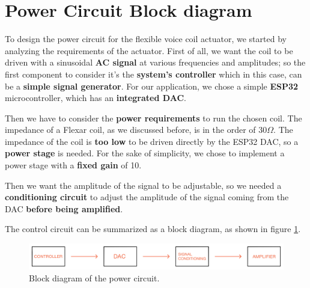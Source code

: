 \section{Power Circuit Block diagram}

To design the power circuit for the flexible voice coil actuator, we started by analyzing the requirements of the actuator.
First of all, we want the coil to be driven with a sinusoidal \textbf{AC signal} at various frequencies and amplitudes; so the first component to consider it's the \textbf{system's controller} which in this case, can be a \textbf{simple signal generator}.
For our application, we chose a simple \textbf{ESP32} microcontroller, which has an \textbf{integrated DAC}.
\bigskip

Then we have to consider the \textbf{power requirements} to run the chosen coil.
The impedance of a Flexar coil, as we discussed before, is in the order of 30$\Omega$.
The impedance of the coil is \textbf{too low} to be driven directly by the ESP32 DAC, so a \textbf{power stage} is needed.
For the sake of simplicity, we chose to implement a power stage with a \textbf{fixed gain} of 10.
\bigskip

Then we want the amplitude of the signal to be adjustable, so we needed a \textbf{conditioning circuit} to adjust the amplitude of the signal coming from the DAC \textbf{before being amplified}.
\bigskip

The control circuit can be summarized as a block diagram, as shown in figure \ref{fig: Power_Circuit_Block_Diagram}.
\begin{figure}[H]
    \centering
    \includegraphics[width=0.9\linewidth]{Chapters/Chapter4/Figures/power_circuit_block_diagram.jpg}
    \caption{Block diagram of the power circuit.}
    \label{fig: Power_Circuit_Block_Diagram}    
\end{figure}